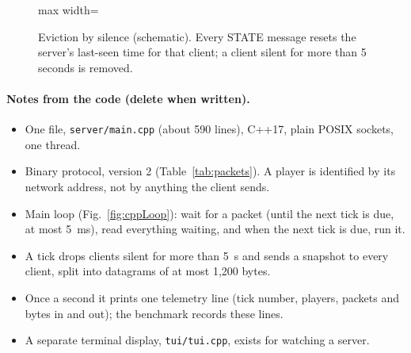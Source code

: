 \IfFileExists{IEEEtran.cls}{\ieeetrue\documentclass[conference]{IEEEtran}}{\ieeefalse\documentclass[twocolumn,10pt]{article}}
\begin{document}
\begin{figure}[H]
\centering
\begin{adjustbox}{max width=\columnwidth}
\end{adjustbox}
\caption{Eviction by silence (schematic). Every STATE message resets the server's last-seen time for that client; a client silent for more than 5 seconds is removed.}
\label{fig:evict}
\end{figure}

\paragraph{Notes from the code (delete when written).}
\begin{itemize}
\item One file, \texttt{server/main.cpp} (about 590 lines), C++17, plain POSIX sockets, one thread.
\item Binary protocol, version 2 (Table~\ref{tab:packets}). A player is identified by its network address, not by anything the client sends.
\item Main loop (Fig.~\ref{fig:cppLoop}): wait for a packet (until the next tick is due, at most 5~ms), read everything waiting, and when the next tick is due, run it.
\item A tick drops clients silent for more than 5~s and sends a snapshot to every client, split into datagrams of at most 1,200 bytes.
\item Once a second it prints one telemetry line (tick number, players, packets and bytes in and out); the benchmark records these lines.
\item A separate terminal display, \texttt{tui/tui.cpp}, exists for watching a server.
\end{itemize}
\end{document}
